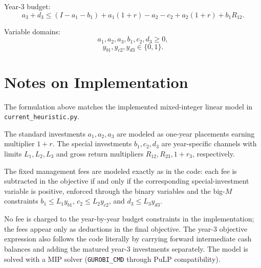 Year-3 budget:
\[
a_3 + d_3 \le (I-a_1-b_1)+a_1(1+r)-a_2-c_2+a_2(1+r)+b_1R_{12}.
\]

Variable domains:
\[
a_1,a_2,a_3,b_1,c_2,d_3 \ge 0,
\]
\[
y_{b1},y_{c2},y_{d3}\in\{0,1\}.
\]

\section*{Notes on Implementation}

The formulation above matches the implemented mixed-integer linear model in \texttt{current\_heuristic.py}.

The standard investments \(a_1,a_2,a_3\) are modeled as one-year placements earning multiplier \(1+r\). The special investments \(b_1,c_2,d_3\) are year-specific channels with limits \(L_1,L_2,L_3\) and gross return multipliers \(R_{12},R_{23},1+r_3\), respectively.

The fixed management fees are modeled exactly as in the code: each fee is subtracted in the objective if and only if the corresponding special-investment variable is positive, enforced through the binary variables and the big-\(M\) constraints \(b_1 \le L_1 y_{b1}\), \(c_2 \le L_2 y_{c2}\), and \(d_3 \le L_3 y_{d3}\).

No fee is charged to the year-by-year budget constraints in the implementation; the fees appear only as deductions in the final objective. The year-3 objective expression also follows the code literally by carrying forward intermediate cash balances and adding the matured year-3 investments separately. The model is solved with a MIP solver (\texttt{GUROBI\_CMD} through PuLP compatibility).
